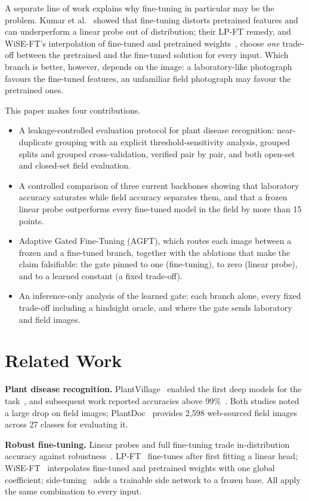 \documentclass[conference]{IEEEtran}
\begin{document}
A separate line of work explains why fine-tuning in particular may be the problem. Kumar et al.~\cite{kumar2022finetuning} showed that fine-tuning distorts pretrained features and can underperform a linear probe out of distribution; their LP-FT remedy, and WiSE-FT's interpolation of fine-tuned and pretrained weights~\cite{wortsman2022robust}, choose \emph{one} trade-off between the pretrained and the fine-tuned solution for every input. Which branch is better, however, depends on the image: a laboratory-like photograph favours the fine-tuned features, an unfamiliar field photograph may favour the pretrained ones.

This paper makes four contributions.
\begin{itemize}
\item A leakage-controlled evaluation protocol for plant disease recognition: near-duplicate grouping with an explicit threshold-sensitivity analysis, grouped splits and grouped cross-validation, verified pair by pair, and both open-set and closed-set field evaluation.
\item A controlled comparison of three current backbones showing that laboratory accuracy saturates while field accuracy separates them, and that a frozen linear probe outperforms every fine-tuned model in the field by more than 15 points.
\item Adaptive Gated Fine-Tuning (AGFT), which routes each image between a frozen and a fine-tuned branch, together with the ablations that make the claim falsifiable: the gate pinned to one (fine-tuning), to zero (linear probe), and to a learned constant (a fixed trade-off).
\item An inference-only analysis of the learned gate: each branch alone, every fixed trade-off including a hindsight oracle, and where the gate sends laboratory and field images.
\end{itemize}

\section{Related Work}
\textbf{Plant disease recognition.} PlantVillage~\cite{hughes2015plantvillage} enabled the first deep models for the task~\cite{mohanty2016using}, and subsequent work reported accuracies above 99\%~\cite{ferentinos2018deep}. Both studies noted a large drop on field images; PlantDoc~\cite{singh2020plantdoc} provides 2,598 web-sourced field images across 27 classes for evaluating it.

\textbf{Robust fine-tuning.} Linear probes and full fine-tuning trade in-distribution accuracy against robustness~\cite{kornblith2019better,kumar2022finetuning}. LP-FT~\cite{kumar2022finetuning} fine-tunes after first fitting a linear head; WiSE-FT~\cite{wortsman2022robust} interpolates fine-tuned and pretrained weights with one global coefficient; side-tuning~\cite{zhang2020sidetuning} adds a trainable side network to a frozen base. All apply the same combination to every input.
\end{document}

